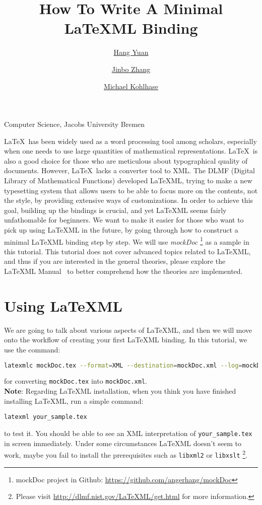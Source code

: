\documentclass[a4paper]{article}
\title{\textbf{How To Write A Minimal \LaTeX ML Binding}}
\author{\href{mailto:h.yuan@jacobs-university.de}{Hang Yuan} \and 
	\href{mailto:jin.zhang@jacobs-university.de}{Jinbo Zhang} \and \href{mailto:m.kohlhase@jacobs-university.de}{Michael Kohlhase}}
\date{}
\begin{document}
\maketitle
\begin{center}
Computer Science, Jacobs University Bremen\\
\end{center}
\noindent\LaTeX\ has been widely used as a word processing tool among scholars, especially when one needs to use large quantities of mathematical representations. \LaTeX\ is also a good choice for those who are meticulous about typographical quality of documents. However, \LaTeX\ lacks a converter tool to XML. The DLMF (Digital Library of Mathematical Functions) developed \LaTeX ML, trying to make a new typesetting system that allows users to be able to focus more on the contents, not the style, by providing extensive ways of customizations. In order to achieve this goal, building up the bindings is crucial, and yet \LaTeX ML seems fairly unfathomable for beginners. We want to make it easier for those who
want to pick up using \LaTeX ML in the future, by going through how to construct a minimal \LaTeX ML binding step by step. We will use \textit{mockDoc} \footnote{mockDoc project in Github: \url{https://github.com/angerhang/mockDoc}} as a sample in this tutorial. This tutorial does not cover advanced topics related to \LaTeX ML, and thus if you are interested in the general theories, please explore the \LaTeX ML Manual~\cite{manual} to better comprehend how the theories are implemented.

\section{Using LaTeXML}
We are going to talk about various aspects of \LaTeX ML, and then we will move onto the workflow of creating your first \LaTeX ML binding. In this tutorial, we use the command:
\begin{lstlisting}[language=bash]
latexmlc mockDoc.tex --format=XML --destination=mockDoc.xml --log=mockDoc.xml.log
\end{lstlisting}
for converting \texttt{mockDoc.tex} into \texttt{mockDoc.xml}. \\

\noindent \textbf{Note}: Regarding \LaTeX ML installation, when you think you have finished installing \LaTeX ML, run a simple command:
\begin{lstlisting}
latexml your_sample.tex
\end{lstlisting}
to test it. You should be able to see an XML interpretation of \texttt{your\_sample.tex} in screen immediately. Under some circumstances \LaTeX ML doesn't seem to work, maybe you fail to install the prerequisites such as \texttt{libxml2} or \texttt{libxslt} \footnote{Please visit \url{http://dlmf.nist.gov/LaTeXML/get.html} for more information.}. \\
\end{document}
